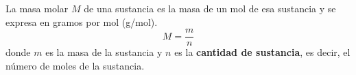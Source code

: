 \begin{warncard}[adjusted title={Masa molar}]
    La masa molar $M$ de una sustancia es la masa de un mol de esa sustancia y se expresa en gramos por mol (g/mol).
    \begin{equation}\label{eq:masa_molar}
        M=\frac{m}{n}
    \end{equation}
    donde $m$ es la masa de la sustancia y $n$ es la \textbf{cantidad de sustancia}, es decir, el número de moles de la sustancia.
\end{warncard}
